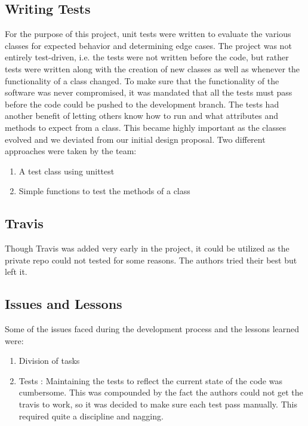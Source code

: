 \subsection{Writing Tests}
For the purpose of this project, unit tests were written to evaluate the various classes for expected behavior and determining edge cases. The project was not entirely test-driven, i.e. the tests were not written before the code, but rather tests were written along with the creation of new classes as well as whenever the functionality of a class changed. To make sure that the functionality of the software was never compromised, it was mandated that all the tests must pass before the code could be pushed to the {\ttfamily development} branch. The tests had another benefit of 
letting others know how to run and what attributes and methods to expect from a class. This became highly important as the classes evolved and we deviated from our initial design proposal.
Two different approaches were taken by the team:
\begin{enumerate}
	\item A test class using unittest
	\item Simple functions to test the methods of a class
\end{enumerate}

\subsection{Travis}
Though Travis was added very early in the project, it could be utilized as the private repo could not tested for some reasons. The authors tried their best but left it.

\subsection{Issues and Lessons}
Some of the issues faced during the development process and the lessons learned were:
\begin{enumerate}
\item Division of tasks
\item Tests : Maintaining the tests to reflect the current state of the code was cumbersome. This was compounded by the fact the authors could not get the travis to work, so it was decided to make sure each test pass manually. This required quite a discipline and nagging.
\end{enumerate}

